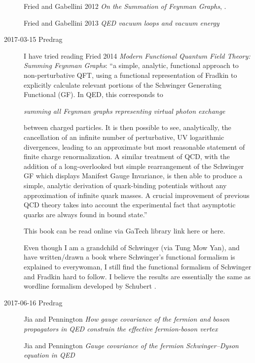 \begin{description}
Fried and Gabellini 2012
{\em On the Summation of Feynman Graphs}, .

Fried and Gabellini 2013
{\em {QED} vacuum loops and vacuum energy}

\item[2017-03-15 Predrag] I have tried reading
Fried 2014
{\em Modern Functional Quantum Field Theory: Summing Feynman Graphs}:
``a simple, analytic, functional approach to non-perturbative QFT, using a
functional representation of Fradkin to explicitly
calculate relevant portions of the Schwinger Generating Functional (GF).
In QED, this corresponds to

\emph{summing all Feynman graphs representing virtual photon exchange}

between charged particles. It is then possible to
see, analytically, the cancellation of an infinite number of
perturbative, UV logarithmic divergences, leading to an approximate but
most reasonable statement of finite charge renormalization. A similar
treatment of QCD, with the addition of a long-overlooked but simple
rearrangement of the Schwinger GF which displays Manifest Gauge
Invariance, is then able to produce a simple, analytic derivation of
quark-binding potentials without any approximation of infinite quark
masses. A crucial improvement of previous QCD theory takes into account
the experimental fact that asymptotic quarks are always found in bound
state.''

This book can be read online via GaTech library link
{here} or
{here}.

Even though I am a grandchild of Schwinger (via Tung Mow Yan), and have
written/drawn a book where Schwinger's functional formalism is explained
to everywoman, I still find the functional formalism of Schwinger and
Fradkin hard to follow. I believe the results are
essentially the same as wordline formalism developed by Schubert \etal.

\item[2017-06-16 Predrag]

Jia and Pennington
{\em How gauge covariance of the fermion and boson propagators in {QED}
constrain the effective fermion-boson vertex}

Jia and Pennington
{\em Gauge covariance of the fermion {Schwinger–Dyson} equation in {QED}}


\end{description}
